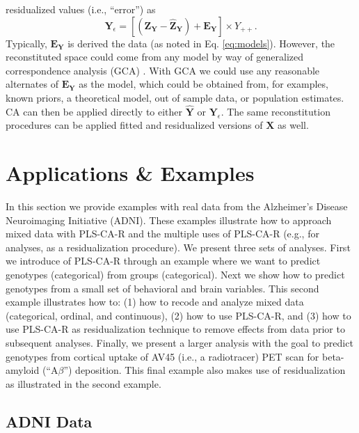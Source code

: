 \documentclass[12pt]{article}
\begin{document}
residualized values (i.e., ``error'') as \begin{equation}
{\mathbf Y}_{\epsilon} = [({\mathbf Z}_{\mathbf Y} - \widehat{{\mathbf Z}}_{\mathbf Y}) + {\mathbf E}_{\mathbf Y}] \times Y_{++}.
\label{eq:Yresid}
\end{equation} Typically, \({\mathbf E}_{\mathbf Y}\) is derived the
data (as noted in Eq. \ref{eq:models}). However, the reconstituted space
could come from any model by way of generalized correspondence analysis
(GCA)
\citep{escofier1983analyse, escofier1984analyse, grassi1994correspondence, beaton2018generalization}.
With GCA we could use any reasonable alternates of
\({\mathbf E}_{\mathbf Y}\) as the model, which could be obtained from,
for examples, known priors, a theoretical model, out of sample data, or
population estimates. CA can then be applied directly to either
\(\widehat{\mathbf Y}\) or \({\mathbf Y}_{\epsilon}\). The same
reconstitution procedures can be applied fitted and residualized
versions of \({\mathbf X}\) as well.

\hypertarget{applications-examples}{%
\section{Applications \& Examples}\label{applications-examples}}

\label{section:appex}

In this section we provide examples with real data from the Alzheimer's
Disease Neuroimaging Initiative (ADNI). These examples illustrate how to
approach mixed data with PLS-CA-R and the multiple uses of PLS-CA-R
(e.g., for analyses, as a residualization procedure). We present three
sets of analyses. First we introduce of PLS-CA-R through an example
where we want to predict genotypes (categorical) from groups
(categorical). Next we show how to predict genotypes from a small set of
behavioral and brain variables. This second example illustrates how to:
(1) how to recode and analyze mixed data (categorical, ordinal, and
continuous), (2) how to use PLS-CA-R, and (3) how to use PLS-CA-R as
residualization technique to remove effects from data prior to
subsequent analyses. Finally, we present a larger analysis with the goal
to predict genotypes from cortical uptake of AV45 (i.e., a radiotracer)
PET scan for beta-amyloid (``A\(\beta\)'') deposition. This final
example also makes use of residualization as illustrated in the second
example.

\hypertarget{adni-data}{%
\subsection{ADNI Data}\label{adni-data}}
\end{document}
